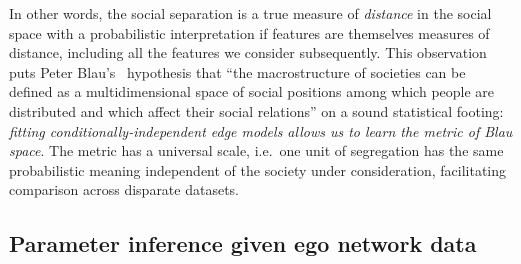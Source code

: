 \documentclass{scrartcl}
\begin{document}
In other words, the social separation is a true measure of \emph{distance} in the social space with a probabilistic interpretation if features are themselves measures of distance, including all the features we consider subsequently.
This observation puts Peter Blau's~\cite{Blau1977} hypothesis that ``the macrostructure of societies can be defined as a multidimensional space of social positions among which people are distributed and which affect their social relations'' on a sound statistical footing: \emph{fitting conditionally-independent edge models allows us to learn the metric of Blau space}. The metric has a universal scale, i.e.\ one unit of segregation has the same probabilistic meaning independent of the society under consideration, facilitating comparison across disparate datasets.

\subsection{Parameter inference given ego network data\label{sec:inference}}
\end{document}
